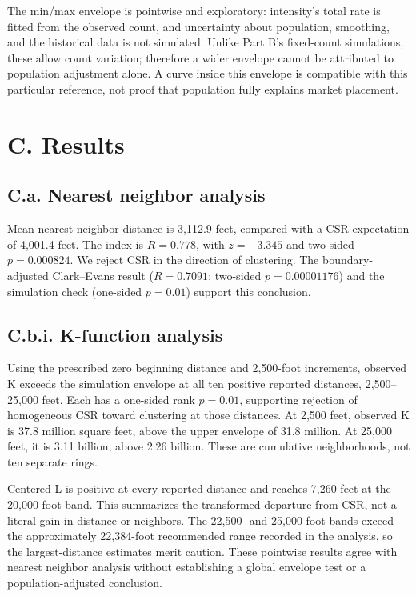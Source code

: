 \documentclass[
  10pt,
]{article}
\begin{document}
The min/max envelope is pointwise and exploratory: intensity's total
rate is fitted from the observed count, and uncertainty about
population, smoothing, and the historical data is not simulated. Unlike
Part B's fixed-count simulations, these allow count variation; therefore
a wider envelope cannot be attributed to population adjustment alone. A
curve inside this envelope is compatible with this particular reference,
not proof that population fully explains market placement.

\newpage

\section{C. Results}\label{c.-results}

\subsection{C.a. Nearest neighbor
analysis}\label{c.a.-nearest-neighbor-analysis}

Mean nearest neighbor distance is 3,112.9 feet, compared with a CSR
expectation of 4,001.4 feet. The index is \(R=0.778\), with \(z=-3.345\)
and two-sided \(p=0.000824\). We reject CSR in the direction of
clustering. The boundary-adjusted Clark--Evans result (\(R=0.7091\);
two-sided \(p=0.00001176\)) and the simulation check (one-sided
\(p=0.01\)) support this conclusion.

\subsection{C.b.i. K-function
analysis}\label{c.b.i.-k-function-analysis}

Using the prescribed zero beginning distance and 2,500-foot increments,
observed K exceeds the simulation envelope at all ten positive reported
distances, 2,500--25,000 feet. Each has a one-sided rank \(p=0.01\),
supporting rejection of homogeneous CSR toward clustering at those
distances. At 2,500 feet, observed K is 37.8 million square feet, above
the upper envelope of 31.8 million. At 25,000 feet, it is 3.11 billion,
above 2.26 billion. These are cumulative neighborhoods, not ten separate
rings.

Centered L is positive at every reported distance and reaches 7,260 feet
at the 20,000-foot band. This summarizes the transformed departure from
CSR, not a literal gain in distance or neighbors. The 22,500- and
25,000-foot bands exceed the approximately 22,384-foot recommended range
recorded in the analysis, so the largest-distance estimates merit
caution. These pointwise results agree with nearest neighbor analysis
without establishing a global envelope test or a population-adjusted
conclusion.
\end{document}
